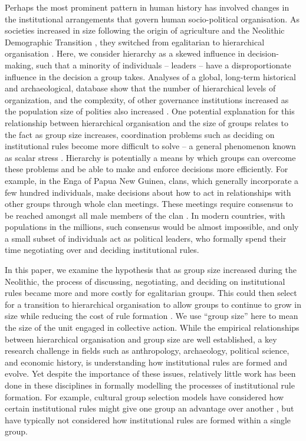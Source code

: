 \documentclass{rstb}
\begin{document}
\begin{linenumbers}
Perhaps the most prominent pattern in human history has involved changes in the institutional arrangements that govern human socio-political organisation. As societies increased in size following the origin of agriculture and the Neolithic Demographic Transition \cite{Bocquet-Appel:2011:a}, they switched from egalitarian to hierarchical organisation \cite{Boehm:1999:a,Price:1995:a,Price:2010:a}. Here, we consider hierarchy as a skewed influence in decision-making, such that a minority of individuals -- leaders -- have a disproportionate influence in the decision a group takes. Analyses of a global, long-term historical and archaeological, database show that the number of hierarchical levels of organization, and the complexity, of other governance institutions increased as the population size of polities also increased \cite{Turchin:2018:a}. One potential explanation for this relationship between hierarchical organisation and the size of groups relates to the fact as group size increases, coordination problems such as deciding on institutional rules become more difficult to solve -- a general phenomenon known as scalar stress \cite{Johnson:1982:a}. Hierarchy is potentially a means by which groups can overcome these problems and be able to make and enforce decisions more efficiently. For example, in the Enga of Papua New Guinea, clans, which generally incorporate a few hundred individuals, make decisions about how to act in relationships with other groups through whole clan meetings. These meetings require consensus to be reached amongst all male members of the clan \cite{Johnson:2000:A}. In modern countries, with populations in the millions, such consensus would be almost impossible, and only a small subset of individuals act as political leaders, who formally spend their time negotiating over and deciding institutional rules.  


In this paper, we examine the hypothesis that as group size increased during the Neolithic, the process of discussing, negotiating, and deciding on institutional rules became more and more costly for egalitarian groups. This could then select for a transition to hierarchical organisation to allow groups to continue to grow in size while reducing the cost of rule formation \cite{North:1990:a,Fukuyama:2011:a}. We use ``group size'' here to mean the size of the unit engaged in collective action. While the empirical relationships between hierarchical organisation and group size are well established, a key research challenge in fields such as anthropology, archaeology, political science, and economic history, is understanding how institutional rules are formed and evolve. Yet despite the importance of these issues, relatively little work has been done in these disciplines in formally modelling the processes of institutional rule formation. For example, cultural group selection models have considered how certain institutional rules might give one group an advantage over another \cite{Richerson:2016:a}, but have typically not considered how institutional rules are formed within a single group. 


\end{linenumbers}
\end{document}
